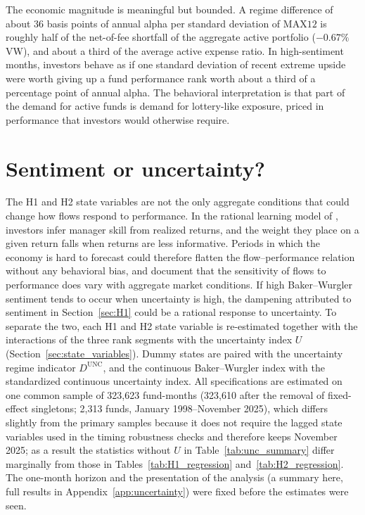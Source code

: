 \documentclass[12pt, oneside]{report}
\begin{document}


The economic magnitude is meaningful but bounded. A regime difference of
about 36 basis points of annual alpha per standard deviation of $\text{MAX12}$ is
roughly half of the net-of-fee shortfall of the aggregate active
portfolio ($-0.67\%$ VW), and about a third of the average active expense
ratio. In high-sentiment months, investors behave as if one standard
deviation of recent extreme upside were worth giving up a fund
performance rank worth about a third of a percentage point of annual
alpha. The behavioral interpretation is that part of the demand for
active funds is demand for lottery-like exposure, priced in performance
that investors would otherwise require.

\section{Sentiment or uncertainty?}
\label{sec:sent_or_unc}

\noindent The H1 and H2 state variables are not the only aggregate
conditions that could change how flows respond to performance. In the
rational learning model of \textcite{BerkGreen2004}, investors infer
manager skill from realized returns, and the weight they place on a given
return falls when returns are less informative. Periods in which the
economy is hard to forecast could therefore flatten the flow--performance
relation without any behavioral bias, and \textcite{FranzoniSchmalz2017}
document that the sensitivity of flows to performance does vary with
aggregate market conditions. If high Baker--Wurgler sentiment tends to
occur when uncertainty is high, the dampening attributed to sentiment in
Section~\ref{sec:H1} could be a rational response to uncertainty. To
separate the two, each H1 and H2 state variable is re-estimated together
with the interactions of the three rank segments with the
\textcite{JuradoLudvigsonNg2015} uncertainty index $U$
(Section~\ref{sec:state_variables}). Dummy states are paired with the
uncertainty regime indicator $D^{\text{UNC}}$, and the continuous
Baker--Wurgler index with the standardized continuous uncertainty index.
All specifications are estimated on one common sample of 323,623
fund-months (323,610 after the removal of fixed-effect singletons;
2,313 funds, January 1998--November 2025), which differs
slightly from the primary samples because it does not require the
lagged state variables used in the timing robustness checks and
therefore keeps November 2025; as a result the statistics without $U$ in
Table~\ref{tab:unc_summary} differ marginally from those in
Tables~\ref{tab:H1_regression} and~\ref{tab:H2_regression}. The
one-month horizon and the presentation of the analysis (a summary here,
full results in Appendix~\ref{app:uncertainty}) were fixed before the
estimates were seen.
\end{document}
